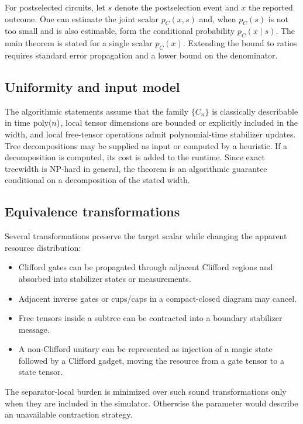 For postselected circuits, let \(s\) denote the postselection event and \(x\) the reported outcome. One can estimate the joint scalar \(p_C(x,s)\) and, when \(p_C(s)\) is not too small and is also estimable, form the conditional probability \(p_C(x\mid s)\). The main theorem is stated for a single scalar \(p_C(x)\). Extending the bound to ratios requires standard error propagation and a lower bound on the denominator.

\subsection{Uniformity and input model}

The algorithmic statements assume that the family \(\{C_n\}\) is classically describable in time \(\operatorname{poly}(n)\), local tensor dimensions are bounded or explicitly included in the width, and local free-tensor operations admit polynomial-time stabilizer updates. Tree decompositions may be supplied as input or computed by a heuristic. If a decomposition is computed, its cost is added to the runtime. Since exact treewidth is NP-hard in general, the theorem is an algorithmic guarantee conditional on a decomposition of the stated width.

\subsection{Equivalence transformations}

Several transformations preserve the target scalar while changing the apparent resource distribution:
\begin{itemize}[leftmargin=1.2cm]
\item Clifford gates can be propagated through adjacent Clifford regions and absorbed into stabilizer states or measurements.
\item Adjacent inverse gates or cups/caps in a compact-closed diagram may cancel.
\item Free tensors inside a subtree can be contracted into a boundary stabilizer message.
\item A non-Clifford unitary can be represented as injection of a magic state followed by a Clifford gadget, moving the resource from a gate tensor to a state tensor.
\end{itemize}
The separator-local burden is minimized over such sound transformations only when they are included in the simulator. Otherwise the parameter would describe an unavailable contraction strategy.
